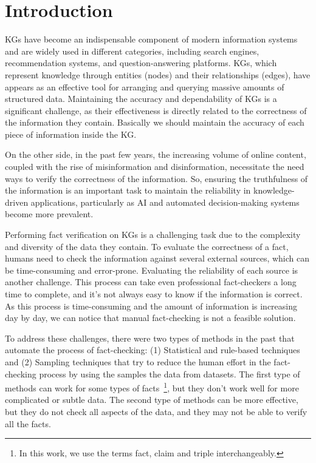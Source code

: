 \chapter{Introduction}\label{ch:intro}
\acp{KG} have become an indispensable component of modern information systems and are widely used in different categories, including search engines, recommendation systems, and question-answering platforms.
\acp{KG}, which represent knowledge through entities (nodes) and their relationships (edges), have appears as an effective tool for arranging and querying massive amounts of structured data.
Maintaining the accuracy and dependability of \acp{KG} is a significant challenge, as their effectiveness is directly related to the correctness of the information they contain.
Basically we should maintain the accuracy of each piece of information inside the \ac{KG}.

On the other side, in the past few years, the increasing volume of online content, coupled with the rise of misinformation and disinformation, necessitate the need ways to verify the correctness of the information.
So, ensuring the truthfulness of the information is an important task to maintain the reliability in knowledge-driven applications, particularly as \ac{AI} and automated decision-making systems become more prevalent.

Performing fact verification on \acp{KG} is a challenging task due to the complexity and diversity of the data they contain.
To evaluate the correctness of a fact, humans need to check the information against several external sources, which can be time-consuming and error-prone.
Evaluating the reliability of each source is another challenge.
This process can take even professional fact-checkers a long time to complete, and it's not always easy to know if the information is correct.
As this process is time-consuming and the amount of information is increasing day by day, we can notice that manual fact-checking is not a feasible solution.

To address these challenges, there were two types of methods in the past that automate the process of fact-checking:
(1) Statistical and rule-based techniques and (2) Sampling techniques that try to reduce the human effort in the fact-checking process by using the samples the data from datasets.
The first type of methods can work for some types of facts~\footnote{In this work, we use the terms fact, claim and triple interchangeably.}, but they don't work well for more complicated or subtle data.
The second type of methods can be more effective, but they do not check all aspects of the data, and they may not be able to verify all the facts.

